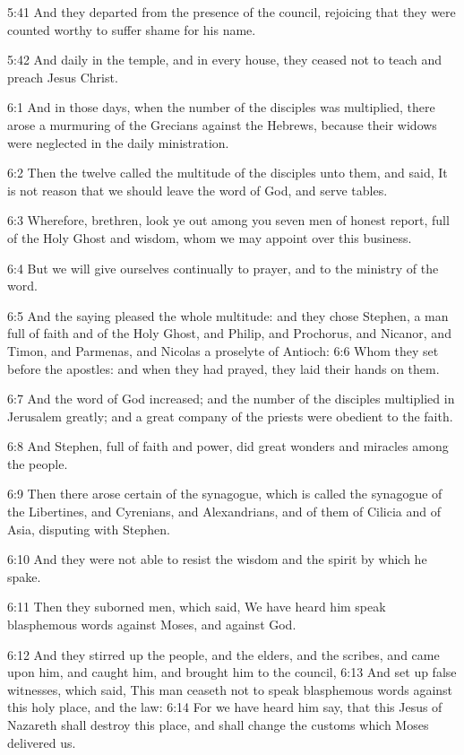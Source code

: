 5:41 And they departed from the presence of the council, rejoicing that they were counted worthy to suffer shame for his name.

5:42 And daily in the temple, and in every house, they ceased not to teach and preach Jesus Christ.

6:1 And in those days, when the number of the disciples was multiplied, there arose a murmuring of the Grecians against the Hebrews, because their widows were neglected in the daily ministration.

6:2 Then the twelve called the multitude of the disciples unto them, and said, It is not reason that we should leave the word of God, and serve tables.

6:3 Wherefore, brethren, look ye out among you seven men of honest report, full of the Holy Ghost and wisdom, whom we may appoint over this business.

6:4 But we will give ourselves continually to prayer, and to the ministry of the word.

6:5 And the saying pleased the whole multitude: and they chose Stephen, a man full of faith and of the Holy Ghost, and Philip, and Prochorus, and Nicanor, and Timon, and Parmenas, and Nicolas a proselyte of Antioch: 6:6 Whom they set before the apostles: and when they had prayed, they laid their hands on them.

6:7 And the word of God increased; and the number of the disciples multiplied in Jerusalem greatly; and a great company of the priests were obedient to the faith.

6:8 And Stephen, full of faith and power, did great wonders and miracles among the people.

6:9 Then there arose certain of the synagogue, which is called the synagogue of the Libertines, and Cyrenians, and Alexandrians, and of them of Cilicia and of Asia, disputing with Stephen.

6:10 And they were not able to resist the wisdom and the spirit by which he spake.

6:11 Then they suborned men, which said, We have heard him speak blasphemous words against Moses, and against God.

6:12 And they stirred up the people, and the elders, and the scribes, and came upon him, and caught him, and brought him to the council, 6:13 And set up false witnesses, which said, This man ceaseth not to speak blasphemous words against this holy place, and the law: 6:14 For we have heard him say, that this Jesus of Nazareth shall destroy this place, and shall change the customs which Moses delivered us.

